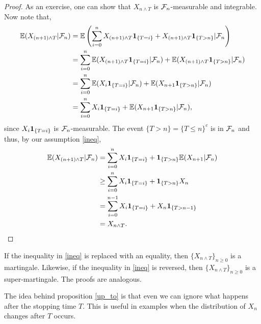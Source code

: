 \begin{proof}
    As an exercise, one can show that $X_{n \land T}$ is ${\mathcal{F}}_n$-measurable and integrable. Now note that,
    \begin{align*}
        {\mathbb{E}}(X_{(n+1) \land T}|{\mathcal{F}}_n) &={\mathbb{E}}\left(\sum_{i=0}^n X_{(n+1)\land T}{{\bf 1}}_{\{T=i\}} + X_{(n+1)\land T}{{\bf 1}}_{\{T > n\}}|{\mathcal{F}}_n\right)\\
        &=\sum_{i=0}^n{\mathbb{E}}(X_{(n+1) \land T}{{\bf 1}}_{\{T=i\}}|{\mathcal{F}}_n) +{\mathbb{E}}(X_{(n+1)\land T}{{\bf 1}}_{\{T> n\}}|{\mathcal{F}}_n)\\
        &=\sum_{i=0}^n{\mathbb{E}}(X_{i}{{\bf 1}}_{\{T=i\}}|{\mathcal{F}}_n) +{\mathbb{E}}(X_{n+1}{{\bf 1}}_{\{T> n\}}|{\mathcal{F}}_n)\\
        &=\sum_{i=0}^n X_i{{\bf 1}}_{\{T=i\}}+{\mathbb{E}}(X_{n+1}{{\bf 1}}_{\{T> n\}}|{\mathcal{F}}_n),
    \end{align*}
    since $X_i{{\bf 1}}_{\{T=i\}}$ is ${\mathcal{F}}_n$-measurable. The event $\{T > n\} = \{T \le n\}^c $ is in ${\mathcal{F}}_n$ and thus, by our assumption \eqref{ineq},
    \begin{align*}
        {\mathbb{E}}(X_{(n+1) \land T}|{\mathcal{F}}_n)&=\sum_{i=0}^n X_i{{\bf 1}}_{\{T=i\}}+{{\bf 1}}_{\{T> n\}}{\mathbb{E}}(X_{n+1}|{\mathcal{F}}_n)\\
        &\ge \sum_{i=0}^n X_i{{\bf 1}}_{\{T=i\}}+{{\bf 1}}_{\{T> n\}}X_n\\
        &=\sum_{i=0}^{n-1}X_i{{\bf 1}}_{\{T=i\}} + X_n{{\bf 1}}_{\{T > n-1\}}\\
        &=X_{n \land T}. \qedhere
    \end{align*}
\end{proof}
\begin{remark}
    If the inequality in \eqref{ineq} is replaced with an equality, then $\{X_{n \land T}\}_{n \ge 0}$ is a martingale. Likewise, if the inequality in \eqref{ineq} is reversed, then $\{X_{n \land T}\}_{n \ge 0}$ is a super-martingale. The proofs are analogous.
\end{remark}
The idea behind proposition \eqref{up_to} is that even we can ignore what happens after the stopping time $T$. This is useful in examples when the distribution of $X_n$ changes after $T$ occurs. 
